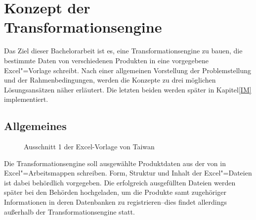 
\chapter[Konzept der Transformationsengine]{Konzept der Transformationsengine} \label{KO}

Das Ziel dieser Bachelorarbeit ist es, eine Transformationsengine zu bauen, die bestimmte Daten von verschiedenen Produkten in eine vorgegebene Excel"=Vorlage schreibt. Nach einer allgemeinen Vorstellung der Problemstellung und der Rahmenbedingungen, werden die Konzepte zu drei möglichen Lösungsansätzen näher erläutert. Die letzten beiden werden später in Kapitel\nbs\ref{IM} implementiert. 

\section{Allgemeines} \label{AL}
\begin{figure}[b]
 \centering
 \caption[Excel-Vorlage für Taiwan -- Ausschnitt 1]{Ausschnitt 1 der Excel-Vorlage von Taiwan}
 \label{fig:t1} 
\end{figure}

Die Transformationsengine soll ausgewählte Produktdaten aus der  von  in Excel"=Arbeitsmappen schreiben. Form, Struktur und Inhalt der Excel"=Dateien ist dabei behördlich vorgegeben. Die erfolgreich ausgefüllten Dateien werden später bei den Behörden hochgeladen, um die Produkte samt zugehöriger Informationen in deren Datenbanken zu registrieren\nbs --\nbs dies findet allerdings außerhalb der Transformationsengine statt.

